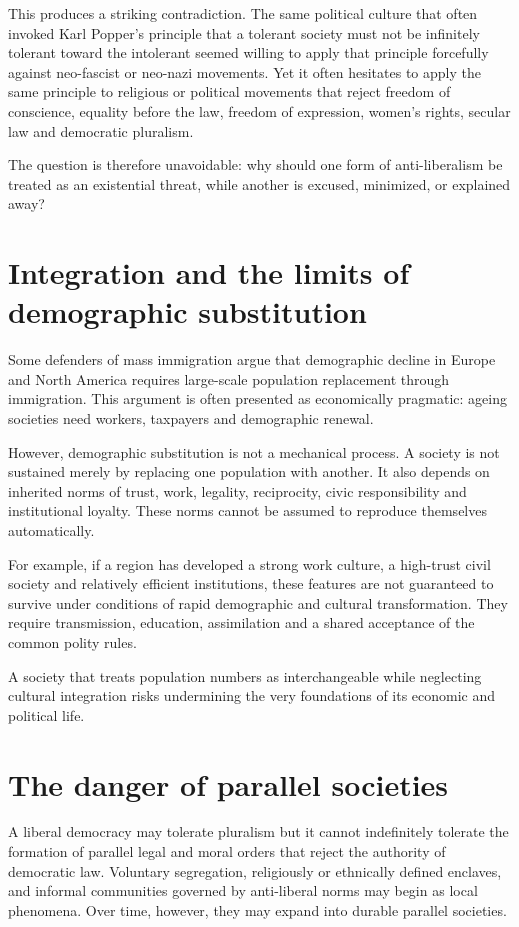 \documentclass[11pt]{article}
\begin{document}
This produces a striking contradiction. The same political culture that often invoked Karl Popper's principle that a tolerant society must not be infinitely tolerant toward the intolerant seemed willing to apply that principle forcefully against neo-fascist or neo-nazi movements. Yet it often hesitates to apply the same principle to religious or political movements that reject freedom of conscience, equality before the law, freedom of expression, women's rights, secular law and democratic pluralism.

The question is therefore unavoidable: why should one form of anti-liberalism be treated as an existential threat, while another is excused, minimized, or explained away?

\section{Integration and the limits of demographic substitution}

Some defenders of mass immigration argue that demographic decline in Europe and North America requires large-scale population replacement through immigration. This argument is often presented as economically pragmatic: ageing societies need workers, taxpayers and demographic renewal.

However, demographic substitution is not a mechanical process. A society is not sustained merely by replacing one population with another. It also depends on inherited norms of trust, work, legality, reciprocity, civic responsibility and institutional loyalty. These norms cannot be assumed to reproduce themselves automatically.

For example, if a region has developed a strong work culture, a high-trust civil society and relatively efficient institutions, these features are not guaranteed to survive under conditions of rapid demographic and cultural transformation. They require transmission, education, assimilation and a shared acceptance of the common polity rules.

A society that treats population numbers as interchangeable while neglecting cultural integration risks undermining the very foundations of its economic and political life.

\section{The danger of parallel societies}

A liberal democracy may tolerate pluralism but it cannot indefinitely tolerate the formation of parallel legal and moral orders that reject the authority of democratic law. Voluntary segregation, religiously or ethnically defined enclaves, and informal communities governed by anti-liberal norms may begin as local phenomena. Over time, however, they may expand into durable parallel societies.
\end{document}
